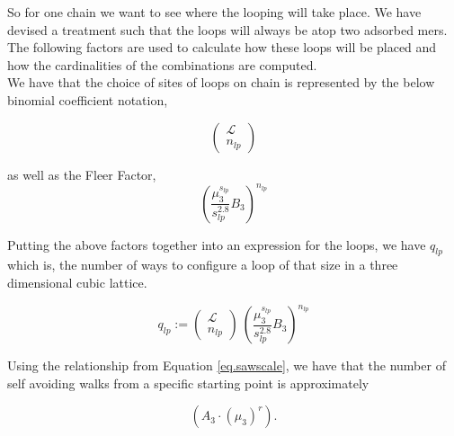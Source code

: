 \documentclass[12pt,letterpaper]{article}
\newcommand{\leng}{\mathcal{L}}
\newcommand{\lr}[1]{\left( #1 \right)}
\begin{document}
So for one chain we want to see where the looping will take place. We have devised a treatment such that the loops will always be atop two adsorbed mers. The following factors are used to calculate how these loops will be placed and how the cardinalities of the combinations are computed.\\

We have that the choice of sites of loops on chain is represented by the below binomial coefficient notation,

\begin{equation}
\lr{
\begin{array}{c}
     \leng\\
     n_{lp} 
\end{array}
}
\label{eq.looploc}
\end{equation}

as well as the Fleer Factor, 
\begin{equation}
    \lr{
        \frac{
            \mu_3^{
                s_{lp}
            }
        }{
            s_{lp}^{2.8}
        }
        B_3
    }
    ^{
        n_{lp}            
    }
\label{FleerFactor}
\end{equation}

Putting the above factors together into an expression for the loops, we have $q_{lp}$ which is, the number of ways to configure a loop of that size in a three dimensional cubic lattice.

\begin{equation}
    q_{lp}
    := 
    \lr{
    \begin{array}{c}
         \leng\\
         n_{lp} 
    \end{array}
    }   
    ~
    \lr{
                \frac{
                    \mu_3^{
                        s_{lp}
                    }
                }{
                    s_{lp}^{2.8}
                }
                B_3
            }
            ^{
                n_{lp}            
    }
\label{refEnum}
\end{equation}

Using the relationship from Equation \ref{eq.sawscale}, we have that the number of self avoiding walks from a specific starting point is approximately 

\begin{equation}
	    \left(A_3\cdot (\mu_{3})^{r}\right).
	\label{eq. SAW}
\end{equation}
\end{document}
